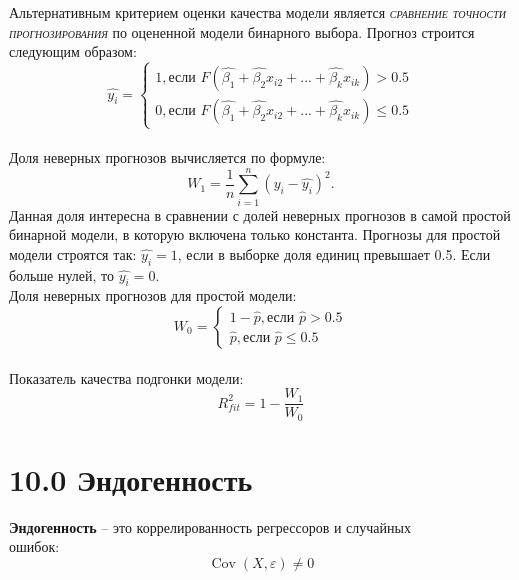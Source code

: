 \documentclass[a0,final]{a0poster}
\DeclareMathOperator{\Cov}{Cov}
\begin{document}
\begin{multicols}{4}
Альтернативным критерием оценки качества модели является \textsc{\textit{сравнение точности прогнозирования}} по оцененной модели бинарного выбора. Прогноз строится следующим образом:\\
\begin{equation*}
\hat{y_i} =
 \begin{cases}
   1, \text{если } F(\hat{\beta_1} + \hat{\beta_2}x_{i2} + ... + \hat{\beta_k}x_{ik}) > 0.5\\
   0, \text{если } F(\hat{\beta_1} + \hat{\beta_2}x_{i2} + ... + \hat{\beta_k}x_{ik}) \leq 0.5
 \end{cases}
\end{equation*}
\\
Доля неверных прогнозов вычисляется по формуле:\\
$$W_1 = \frac{1}{n}\sum\limits_{i=1}^n (y_i - \hat{y_i})^2.$$
Данная доля интересна в сравнении с долей неверных прогнозов в самой простой бинарной модели, в которую включена только константа. Прогнозы для простой модели строятся так: $\hat{y_i} = 1$, если в выборке доля единиц превышает 0.5. Если больше нулей, то $\hat{y_i} = 0$.\\
Доля неверных прогнозов для простой модели:\\
\begin{equation*}
W_0 =
 \begin{cases}
 1 - \hat{p}, \text{если } \hat{p} > 0.5\\
 \hat{p}, \text{если } \hat{p} \leq 0.5
 \end{cases}
\end{equation*}
\\
Показатель качества подгонки модели:\\
$$R^2_{fit} = 1 - \frac{W_1}{W_0}$$

\section*{10.0 Эндогенность}
\begin{tcolorbox}[colback=red!5!white,colframe=red!75!black]
\textbf{Эндогенность} -- это коррелированность регрессоров и случайных\\ ошибок: $$\Cov(X,\varepsilon) \ne 0$$
\end{tcolorbox}


\end{multicols}
\end{document}
